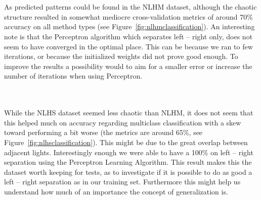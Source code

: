   \begin{minipage}{\linewidth}
  \centering
  \label{fig:nlhmclassification}
  \end{minipage}\\\\

  As predicted patterns could be found in the NLHM dataset, although the chaotic structure resulted in somewhat mediocre cross-validation metrics of around 70\%
  accuracy on all method types (see Figure~\ref{fig:nlhmclassification}).
  An interesting note is that the Perceptron algorithm which separates left -- right only, does not seem to have converged in the optimal place.
  This can be because we ran to few iterations, or because the initialized weights did not prove good enough. To improve the results a possibility
  would to aim for a smaller error or increase the number of iterations when using Perceptron.\\

  \begin{minipage}{\linewidth}
  \centering
  \label{fig:nlhsclassification}
  \end{minipage}\\\\

  While the NLHS dataset seemed less chaotic than NLHM, it does not seem that this helped much on accuracy regarding multiclass classification with a skew
  toward performing a bit worse (the metrics are around 65\%, see Figure~\ref{fig:nlhsclassification}). 
  This might be due to the great overlap between adjacent lights. Interestingly enough we were able to have a 100\% on left -- right separation using the Perceptron Learning Algorithm.
  This result makes this the dataset worth keeping for tests, as to investigate if it is possible to do as good a left -- right separation as in our training set.
  Furthermore this might help us understand how much of an importance the concept of generalization is.\\

